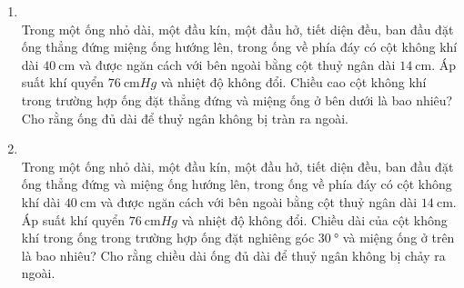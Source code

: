 \begin{enumerate}[label=\bfseries Câu \arabic*:, leftmargin=1.7cm]
\item {}\\
Trong một ống nhỏ dài, một đầu kín, một đầu hở, tiết diện đều, ban đầu đặt ống thẳng đứng miệng ống hướng lên, trong ống về phía đáy có cột không khí dài $\SI{40}{\centi\meter}$ và được ngăn cách với bên ngoài bằng cột thuỷ ngân dài $\SI{14}{\centi\meter}$. Áp suất khí quyển $\SI{76}{\centi\meter Hg}$ và nhiệt độ không đổi. Chiều cao cột không khí trong trường hợp ống đặt thẳng đứng và miệng ống ở bên dưới là bao nhiêu? Cho rằng ống đủ dài để thuỷ ngân không bị tràn ra ngoài.

\item {}\\
Trong một ống nhỏ dài, một đầu kín, một đầu hở, tiết diện đều, ban đầu đặt ống thẳng đứng và miệng ống hướng lên, trong ống về phía đáy có cột không khí dài $\SI{40}{\centi\meter}$ và được ngăn cách với bên ngoài bằng cột thuỷ ngân dài $\SI{14}{\centi\meter}$. Áp suất khí quyển $\SI{76}{\centi\meter Hg}$ và nhiệt độ không đổi. Chiều dài của cột không khí trong ống trong trường hợp ống đặt nghiêng góc $\SI{30}{\degree}$ và miệng ống ở trên là bao nhiêu? Cho rằng chiều dài ống đủ dài để thuỷ ngân không bị chảy ra ngoài.



\end{enumerate}
